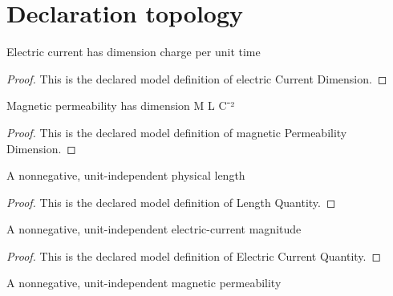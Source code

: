 \section{Declaration topology}
\begin{definition}
  \label{def:physics:phyx-mini-0916:phyxminiproblems-problemphyxmini0916-electriccurrentdimension}
  Electric current has dimension charge per unit time
\end{definition}
\begin{proof}
  This is the declared model definition of electric Current Dimension.
\end{proof}
\begin{definition}
  \label{def:physics:phyx-mini-0916:phyxminiproblems-problemphyxmini0916-magneticpermeabilitydimension}
  Magnetic permeability has dimension M L C⁻²
\end{definition}
\begin{proof}
  This is the declared model definition of magnetic Permeability Dimension.
\end{proof}
\begin{definition}
  \label{def:physics:phyx-mini-0916:phyxminiproblems-problemphyxmini0916-lengthquantity}
  A nonnegative, unit-independent physical length
\end{definition}
\begin{proof}
  This is the declared model definition of Length Quantity.
\end{proof}
\begin{definition}
  \label{def:physics:phyx-mini-0916:phyxminiproblems-problemphyxmini0916-electriccurrentquantity}
  A nonnegative, unit-independent electric-current magnitude
\end{definition}
\begin{proof}
  This is the declared model definition of Electric Current Quantity.
\end{proof}
\begin{definition}
  \label{def:physics:phyx-mini-0916:phyxminiproblems-problemphyxmini0916-magneticpermeabilityquantity}
  A nonnegative, unit-independent magnetic permeability
\end{definition}

